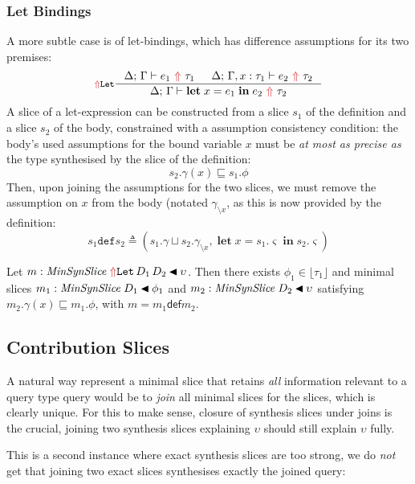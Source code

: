 \subsubsection{\yo Let Bindings}
\label{sec:let-decomp}

A more subtle case is of let-bindings, which has difference assumptions for its two premises:
\[\inference[\synr{Let}]{
  \synthesis{e_1}{\tau_1}
  &
  \synthesis[\Delta;\,\Gamma, x:\tau_1]{e_2}{\tau_2}
}{\synthesis{\mathbf{let}\;x = e_1\;\mathbf{in}\;e_2}{\tau_2}}\]
A slice of a let-expression can be constructed from a slice $s_1$ of the definition and a slice $s_2$ of the body, constrained with a assumption consistency condition: the body's used assumptions for the bound variable $x$ must be \textit{at most as precise as} the type synthesised by the slice of the definition:
\[ s_2.\gamma(x) \mathbin{\sqsubseteq} s_1.\phi \]
Then, upon joining the assumptions for the two slices, we must remove the assumption on $x$ from the body (notated $\gamma_{\setminus x}$, as this is now provided by the definition: 
\[s_1 \texttt{def} s_2 \triangleq (s_1.\gamma \sqcup s_2.\gamma_{\setminus x},\; \mathbf{let}\;x = s_1.\varsigma\;\mathbf{in}\;s_2.\varsigma)\]

\begin{thmcase}\label{thm:min-def-decomp}
Let $m : \minsynslice{\synr{Let}\,D_1\,D_2}{\upsilon}$. Then there exists $\phi_1 \in \lfloor\tau_1\rfloor$ and minimal slices $m_1 : \mathit{MinSynSlice}\;D_1 \mathbin{\blacktriangleleft} \phi_1$ and $m_2 : \mathit{MinSynSlice}\;D_2 \mathbin{\blacktriangleleft} \upsilon$ satisfying $m_2.\gamma(x) \sqsubseteq m_1.\phi$, with $m = m_1 \mathbin{\mathsf{def}} m_2$.
\end{thmcase}

\subsection{\yo Contribution Slices}
\label{sec:join-slices}

A natural way represent a minimal slice that retains \textit{all} information relevant to a query type query would be to \textit{join} all minimal slices for the slices, which is clearly unique. For this to make sense, closure of synthesis slices under joins is the crucial, joining two synthesis slices explaining $\upsilon$ should still explain $\upsilon$ fully.

This is a second instance where exact synthesis slices are too strong, we do \textit{not} get that joining two exact slices synthesises exactly the joined query: 

